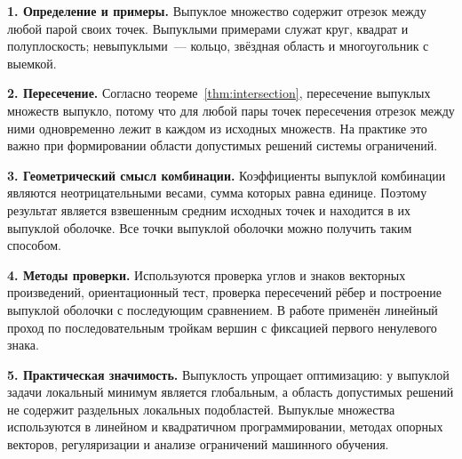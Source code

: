 \textbf{1. Определение и примеры.} Выпуклое множество содержит отрезок между любой парой своих точек. Выпуклыми примерами служат круг, квадрат и полуплоскость; невыпуклыми~--- кольцо, звёздная область и многоугольник с выемкой.

\textbf{2. Пересечение.} Согласно теореме~\ref{thm:intersection}, пересечение выпуклых множеств
выпукло, потому что для любой пары точек пересечения отрезок между ними
одновременно лежит в каждом из исходных множеств. На практике это важно
при формировании области допустимых решений системы ограничений.

\textbf{3. Геометрический смысл комбинации.} Коэффициенты выпуклой комбинации являются неотрицательными весами, сумма которых равна единице. Поэтому результат является взвешенным средним исходных точек и находится в их выпуклой оболочке. Все точки выпуклой оболочки можно получить таким способом.

\textbf{4. Методы проверки.} Используются проверка углов и знаков векторных произведений, ориентационный тест, проверка пересечений рёбер и построение выпуклой оболочки с последующим сравнением. В работе применён линейный проход по последовательным тройкам вершин с фиксацией первого ненулевого знака.

\textbf{5. Практическая значимость.} Выпуклость упрощает оптимизацию:
у выпуклой задачи локальный минимум является глобальным, а область
допустимых решений не содержит раздельных локальных подобластей.
Выпуклые множества используются в линейном и квадратичном
программировании, методах опорных векторов, регуляризации и анализе
ограничений машинного обучения.


